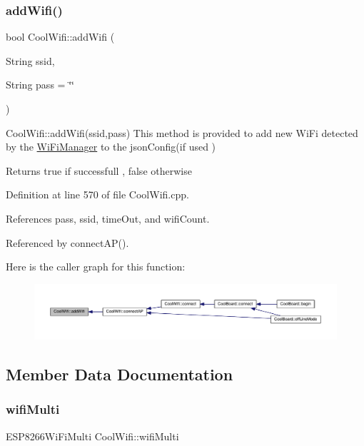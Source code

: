 \subsubsection{\texorpdfstring{add\+Wifi()}{addWifi()}}
{\footnotesize\ttfamily bool Cool\+Wifi\+::add\+Wifi (\begin{DoxyParamCaption}\item[{String}]{ssid,  }\item[{String}]{pass = {\ttfamily \char`\"{}\char`\"{}} }\end{DoxyParamCaption})}

Cool\+Wifi\+::add\+Wifi(ssid,pass) This method is provided to add new Wi\+Fi detected by the \hyperlink{class_wi_fi_manager}{Wi\+Fi\+Manager} to the json\+Config(if used )

\begin{DoxyReturn}{Returns}
true if successfull , false otherwise 
\end{DoxyReturn}


Definition at line 570 of file Cool\+Wifi.\+cpp.



References pass, ssid, time\+Out, and wifi\+Count.



Referenced by connect\+A\+P().

Here is the caller graph for this function\+:
\nopagebreak
\begin{figure}[H]
\begin{center}
\leavevmode
\includegraphics[width=350pt]{d7/d29/class_cool_wifi_a914d7a1df14dd6b75345fb614c34e9d6_icgraph}
\end{center}
\end{figure}


\subsection{Member Data Documentation}
\mbox{\label{class_cool_wifi_a7862a8c0d7239877e2956c14a368aab8}} 
\subsubsection{\texorpdfstring{wifi\+Multi}{wifiMulti}}
{\footnotesize\ttfamily E\+S\+P8266\+Wi\+Fi\+Multi Cool\+Wifi\+::wifi\+Multi\hspace{0.3cm}{\ttfamily [private]}}

